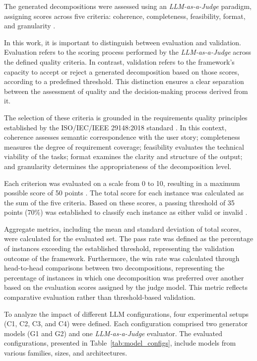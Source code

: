 \documentclass[pdflatex,sn-mathphys-num]{sn-jnl}
\theoremstyle{thmstyleone}%
\theoremstyle{thmstyletwo}%
\theoremstyle{thmstylethree}%
\begin{document}
The generated decompositions were assessed using an \textit{LLM-as-a-Judge} paradigm, assigning scores across five criteria: coherence, completeness, feasibility, format, and granularity \cite{llm_judge_frontiers_2025}. 

In this work, it is important to distinguish between evaluation and validation. Evaluation refers to the scoring process performed by the \textit{LLM-as-a-Judge} across the defined quality criteria. In contrast, validation refers to the framework's capacity to accept or reject a generated decomposition based on those scores, according to a predefined threshold. This distinction ensures a clear separation between the assessment of quality and the decision-making process derived from it.

The selection of these criteria is grounded in the requirements quality principles established by the ISO/IEC/IEEE 29148:2018 standard \cite{iso29148}. In this context, coherence assesses semantic correspondence with the user story; completeness measures the degree of requirement coverage; feasibility evaluates the technical viability of the tasks; format examines the clarity and structure of the output; and granularity determines the appropriateness of the decomposition level.

Each criterion was evaluated on a scale from 0 to 10, resulting in a maximum possible score of 50 points \cite{likert5to7range}. The total score for each instance was calculated as the sum of the five criteria. Based on these scores, a passing threshold of 35 points (70\%) was established to classify each instance as either valid or invalid \cite{threshold70}.

Aggregate metrics, including the mean and standard deviation of total scores, were calculated for the evaluated set. The pass rate was defined as the percentage of instances exceeding the established threshold, representing the validation outcome of the framework. Furthermore, the win rate was calculated through head-to-head comparisons between two decompositions, representing the percentage of instances in which one decomposition was preferred over another based on the evaluation scores assigned by the judge model. This metric reflects comparative evaluation rather than threshold-based validation.

To analyze the impact of different LLM configurations, four experimental setups (C1, C2, C3, and C4) were defined. Each configuration comprised two generator models (G1 and G2) and one \textit{LLM-as-a-Judge} evaluator. The evaluated configurations, presented in Table~\ref{tab:model_configs}, include models from various families, sizes, and architectures.
\end{document}
